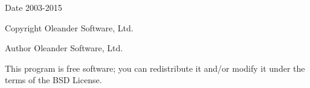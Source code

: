 \begin{DoxyDate}{Date}
2003-\/2015 
\end{DoxyDate}
\begin{DoxyCopyright}{Copyright}
Oleander Software, Ltd. 
\end{DoxyCopyright}
\begin{DoxyAuthor}{Author}
Oleander Software, Ltd.
\end{DoxyAuthor}
This program is free software; you can redistribute it and/or modify it under the terms of the B\-S\-D License. 